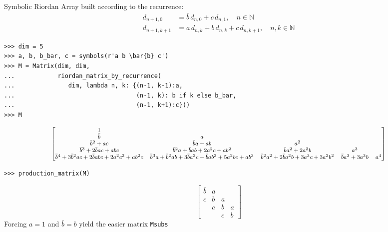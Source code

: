 \begin{example}
Symbolic Riordan Array built according to the recurrence:
\begin{displaymath}
\begin{split}
d_{n+1, 0} &= \bar{b}\,d_{n, 0} + c\,d_{n,1}, \quad n \in\mathbb{N} \\
d_{n+1, k+1} &= a\,d_{n, k} + b\,d_{n, k} + c\,d_{n,k+1}, \quad n,k \in\mathbb{N}
\end{split}
\end{displaymath}
\begin{verbatim}
>>> dim = 5
>>> a, b, b_bar, c = symbols(r'a b \bar{b} c')
>>> M = Matrix(dim, dim,
...            riordan_matrix_by_recurrence(
...               dim, lambda n, k: {(n-1, k-1):a,
...                                  (n-1, k): b if k else b_bar,
...                                  (n-1, k+1):c}))
>>> M
\end{verbatim}
\begin{displaymath}
\footnotesize
\left[\begin{matrix}1 &   &   &   &  \\\bar{b} & a &   &   &  \\\bar{b}^{2} + a c & \bar{b} a + a b & a^{2} &   &  \\\bar{b}^{3} + 2 \bar{b} a c + a b c & \bar{b}^{2} a + \bar{b} a b + 2 a^{2} c + a b^{2} & \bar{b} a^{2} + 2 a^{2} b & a^{3} &  \\\bar{b}^{4} + 3 \bar{b}^{2} a c + 2 \bar{b} a b c + 2 a^{2} c^{2} + a b^{2} c & \bar{b}^{3} a + \bar{b}^{2} a b + 3 \bar{b} a^{2} c + \bar{b} a b^{2} + 5 a^{2} b c + a b^{3} & \bar{b}^{2} a^{2} + 2 \bar{b} a^{2} b + 3 a^{3} c + 3 a^{2} b^{2} & \bar{b} a^{3} + 3 a^{3} b & a^{4}\end{matrix}\right]
\end{displaymath}
\begin{verbatim}
>>> production_matrix(M)
\end{verbatim}
\begin{displaymath}
\left[\begin{matrix}\bar{b} & a &   &  \\c & b & a &  \\  & c & b & a\\  &   & c & b\end{matrix}\right]
\end{displaymath}
Forcing $a=1$ and $\bar{b} = b$ yield the easier matrix \verb|Msubs|
\begin{verbatim}

\end{verbatim}
\end{example}
